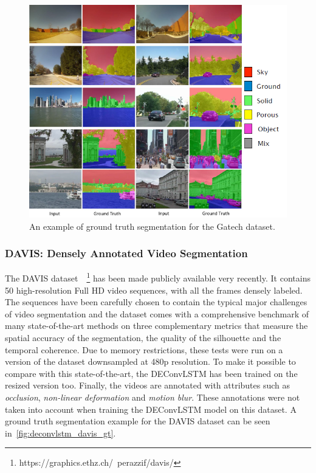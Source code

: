 \begin{figure}[t]
    \centering
    \includegraphics[width=\columnwidth]{img/deconvLSTM/gatech_gt.png}
    \caption{An example of ground truth segmentation for the Gatech dataset.}
    \label{fig:deconvLSTM_gatech_gt}
\end{figure}


\subsubsection{DAVIS: Densely Annotated Video Segmentation}
\label{sec:deconvLSTM_davis}
The DAVIS dataset~\cite{Perazzi2016}~\footnote{
https://graphics.ethz.ch/~perazzif/davis/} has been made publicly available
very recently. It contains 50 high-resolution Full HD video sequences, with
all the frames densely labeled. The sequences have been carefully chosen to
contain the typical major challenges of video segmentation and the dataset
comes with a comprehensive benchmark of many state-of-the-art methods on
three complementary metrics that measure the spatial accuracy of the
segmentation, the quality of the silhouette and the temporal coherence. Due to
memory restrictions, these tests were run on a version of the dataset
downsampled at 480p resolution. To make it possible to compare with this
state-of-the-art, the DEConvLSTM has been trained on the resized version too.
Finally, the videos are annotated with attributes such as \textit{occlusion},
\textit{non-linear deformation} and \textit{motion blur}. These annotations
were not taken into account when training the DEConvLSTM model on this dataset.
A ground truth segmentation example for the DAVIS dataset can be seen
in~\autoref{fig:deconvlstm_davis_gt}.

